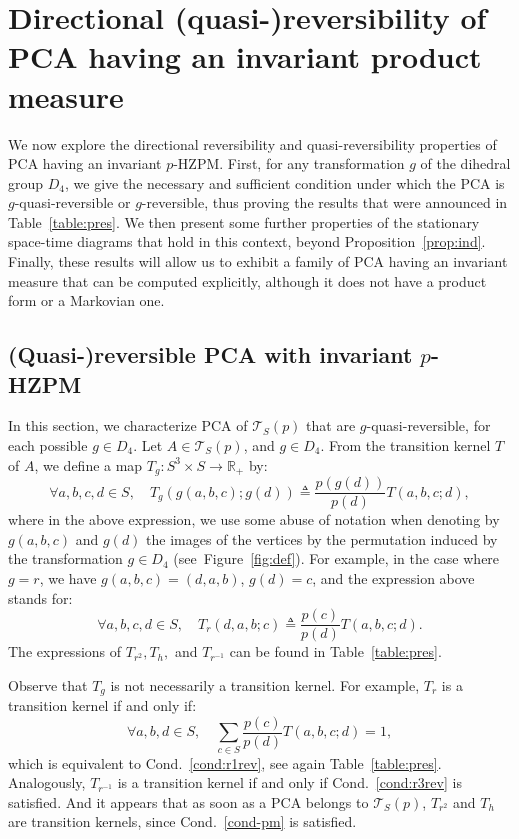 \documentclass[AHL,Unicode,longabstracts]{cedram}
\newcounter{a}
\newcommand{\Cond}{Cond.}
\newcommand{\triang}[2]{\mathcal{T}_{#1} \left(#2 \right)}
\newcommand{\isdef}{\triangleq}
\let\oldforall\forall
\renewcommand*{\forall}{\mathrel{\oldforall}}
\begin{document}
\section{Directional (quasi-)reversibility of PCA having an invariant product measure} \label{sec:rqrPCA}

We now explore the directional reversibility and quasi-reversibility properties of PCA having an invariant $p$-HZPM. First, for any transformation $g$ of the dihedral group $D_4$, we give the necessary and sufficient condition under which the PCA is $g$-quasi-reversible or $g$-reversible, thus proving the results that were announced in Table~\ref{table:pres}. We then present some further properties of the stationary space-time diagrams that hold in this context, beyond Proposition~\ref{prop:ind}. Finally, these results will allow us to exhibit a family of PCA having an invariant measure that can be computed explicitly, although it does not have a product form or a Markovian one.

\subsection{(Quasi-)reversible PCA with invariant \texorpdfstring{$p$}{p}-HZPM}\label{sec:qrPCAinv}
In this section, we characterize PCA of $\triang{S}{p}$ that are $g$-quasi-reversible, for each possible $g\in D_4$. Let $A\in\triang{S}{p}$, and $g\in D_4$. From the transition kernel $T$ of $A$, we define a map $T_g: S^3 \times S\to \mathbb R_+$ by:
\[
\forall a,b,c,d\in S, \quad T_g(g(a,b,c);g(d))\isdef\frac{p(g(d))}{p(d)}T(a,b,c;d),
\]
where in the above expression, we use some abuse of notation when denoting by $g(a,b,c)$ and $g(d)$ the images of the vertices by the permutation induced by the transformation $g\in D_4$ (see~Figure~\ref{fig:def}). For example, in the case where $g=r$, we have $g(a,b,c)=(d,a,b)$, $g(d)=c$, and the expression above stands for:
\[
\forall a,b,c,d\in S, \quad T_r(d,a,b;c)\isdef\frac{p(c)}{p(d)}T(a,b,c;d).
\]
The expressions of $T_{r^2}, T_{h},$ and $T_{r^{-1}}$ can be found in Table~\ref{table:pres}.

Observe that $T_g$ is not necessarily a transition kernel. For example, $T_r$ is a transition kernel if and only if:
\[
\forall a,b,d\in S, \quad \sum_{c\in S} \frac{p(c)}{p(d)}T(a,b,c;d)=1,
\]
which is equivalent to \Cond~\ref{cond:r1rev}, see again Table~\ref{table:pres}. Analogously, $T_{r^{-1}}$ is a transition kernel if and only if \Cond~\ref{cond:r3rev} is satisfied. And it appears that as soon as a PCA belongs to $\triang{S}{p}$, $T_{r^2}$ and $T_h$ are transition kernels, since \Cond~\ref{cond-pm} is satisfied.
\end{document}
